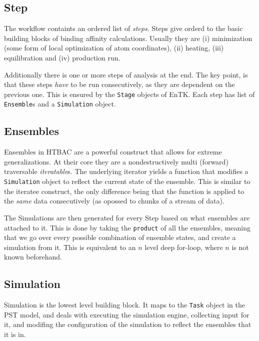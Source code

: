 \subsection{Step}

The workflow containts an ordered list of \emph{steps}. Steps give orderd to
the basic building blocks of binding affinity calculations. Usually they are
(i) minimization (some form of local optimization of atom coordinates), (ii)
heating, (iii) equilibration and (iv) production run.

Additionally there is one or more steps of analysis at the end. The key
point, is that these steps \emph{have} to be run consecutively, as they are
dependent on the previous one. This is ensured by the \texttt{Stage} objects
of EnTK\@. Each step has list of \texttt{Ensemble}s and a \texttt{Simulation}
object.

\subsection{Ensembles}

Ensembles in HTBAC are a powerful construct that allows for extreme
generalizations. At their core they are a nondestructively multi (forward)
traversable \emph{iteratable}s. The underlying iterator yields a function
that modifies a \texttt{Simulation} object to reflect the current state of
the ensemble. This is similar to the iteratee construct, the only difference
being that the function is applied to the \emph{same} data consecutively (as
opossed to chunks of a stream of data).

The Simulations are then generated for every Step based on what ensembles are
attached to it. This is done by taking the \texttt{product} of all the
ensembles, meaning that we go over every possible combination of ensemble
states, and create a simulation from it. This is equivalent to an $n$ level
deep for-loop, where $n$ is not known beforehand.

\subsection{Simulation}

Simulation is the lowest level building block. It maps to the \texttt{Task}
object in the PST model, and deals with executing the simulation engine,
collecting input for it, and modifing the configuration of the simulation to
reflect the ensembles that it is in.

